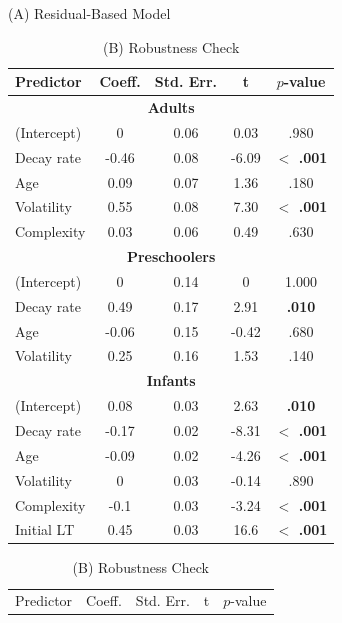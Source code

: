 \documentclass[10pt, letterpaper]{article}
\begin{document}
\begin{table}[t]
    \begin{minipage}{0.48\textwidth}
        \centering
        \caption*{(A) Residual-Based Model}
        \begin{tabular}{@{}lcccc@{}}
            \toprule
            Predictor & Coeff. & Std. Err. & t & $p$-value \\
            \midrule
            \multicolumn{5}{c}{\textbf{Adults}} \\
            (Intercept) & 0 & 0.06 & 0.03 & .980 \\
           Decay rate  & -0.46 & 0.08 & -6.09 & \textbf{$<$ .001} \\
            Age & 0.09 & 0.07 & 1.36 & .180 \\
            Volatility & 0.55 & 0.08 & 7.30 & \textbf{$<$ .001} \\
            Complexity & 0.03 & 0.06 & 0.49 & .630 \\
            \midrule
            \multicolumn{5}{c}{\textbf{Preschoolers}} \\
            (Intercept) & 0 & 0.14 & 0 & 1.000 \\
           Decay rate  & 0.49 & 0.17 & 2.91 & \textbf{.010} \\
            Age & -0.06 & 0.15 & -0.42 & .680 \\
            Volatility & 0.25 & 0.16 & 1.53 & .140 \\
            \midrule
            \multicolumn{5}{c}{\textbf{Infants}} \\
            (Intercept) & 0.08 & 0.03 & 2.63 & \textbf{.010} \\
           Decay rate  & -0.17 & 0.02 & -8.31 & \textbf{$<$ .001} \\
            Age & -0.09 & 0.02 & -4.26 & \textbf{$<$ .001} \\
            Volatility & 0 & 0.03 & -0.14 & .890 \\
            Complexity & -0.1 & 0.03 & -3.24 & \textbf{$<$ .001} \\
            Initial LT & 0.45 & 0.03 & 16.6 & \textbf{$<$ .001} \\
            \bottomrule
        \end{tabular}
    \end{minipage}
    \hfill
    \begin{minipage}{0.48\textwidth}
        \centering
        \caption*{(B) Robustness Check}
        \begin{tabular}{@{}lcccc@{}}
            \toprule
            Predictor & Coeff. & Std. Err. & t & $p$-value \\

\end{tabular}
\end{minipage}
\end{table}
\end{document}
